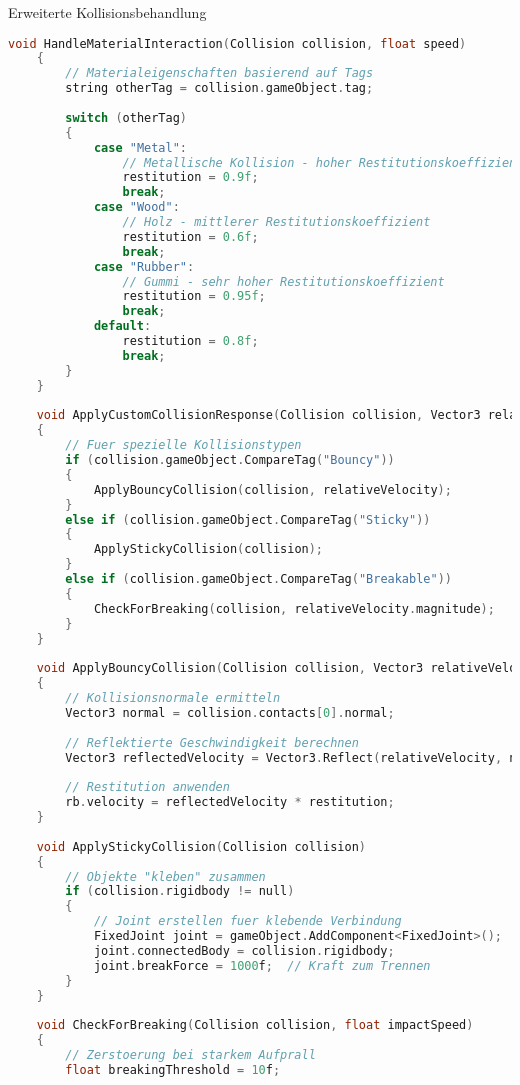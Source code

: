 \begin{code}{Erweiterte Kollisionsbehandlung}
\begin{lstlisting}[language=C, style=basesmol]
    void HandleMaterialInteraction(Collision collision, float speed) 
    {
        // Materialeigenschaften basierend auf Tags
        string otherTag = collision.gameObject.tag;
        
        switch (otherTag) 
        {
            case "Metal":
                // Metallische Kollision - hoher Restitutionskoeffizient
                restitution = 0.9f;
                break;
            case "Wood":
                // Holz - mittlerer Restitutionskoeffizient
                restitution = 0.6f;
                break;
            case "Rubber":
                // Gummi - sehr hoher Restitutionskoeffizient
                restitution = 0.95f;
                break;
            default:
                restitution = 0.8f;
                break;
        }
    }
    
    void ApplyCustomCollisionResponse(Collision collision, Vector3 relativeVelocity) 
    {
        // Fuer spezielle Kollisionstypen
        if (collision.gameObject.CompareTag("Bouncy")) 
        {
            ApplyBouncyCollision(collision, relativeVelocity);
        }
        else if (collision.gameObject.CompareTag("Sticky")) 
        {
            ApplyStickyCollision(collision);
        }
        else if (collision.gameObject.CompareTag("Breakable")) 
        {
            CheckForBreaking(collision, relativeVelocity.magnitude);
        }
    }
    
    void ApplyBouncyCollision(Collision collision, Vector3 relativeVelocity) 
    {
        // Kollisionsnormale ermitteln
        Vector3 normal = collision.contacts[0].normal;
        
        // Reflektierte Geschwindigkeit berechnen
        Vector3 reflectedVelocity = Vector3.Reflect(relativeVelocity, normal);
        
        // Restitution anwenden
        rb.velocity = reflectedVelocity * restitution;
    }
    
    void ApplyStickyCollision(Collision collision) 
    {
        // Objekte "kleben" zusammen
        if (collision.rigidbody != null) 
        {
            // Joint erstellen fuer klebende Verbindung
            FixedJoint joint = gameObject.AddComponent<FixedJoint>();
            joint.connectedBody = collision.rigidbody;
            joint.breakForce = 1000f;  // Kraft zum Trennen
        }
    }
    
    void CheckForBreaking(Collision collision, float impactSpeed) 
    {
        // Zerstoerung bei starkem Aufprall
        float breakingThreshold = 10f;
        

\end{lstlisting}
\end{code}

